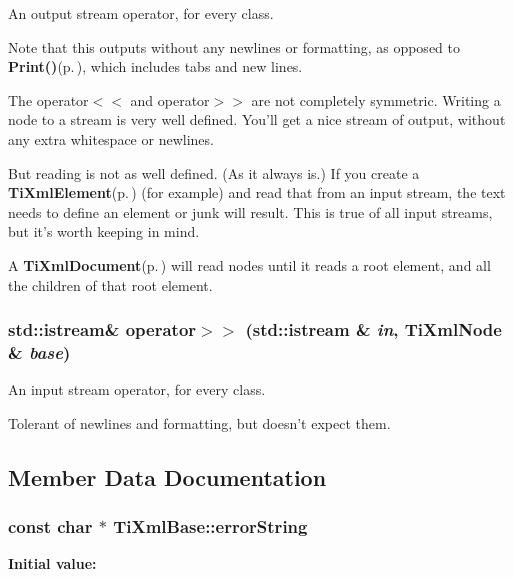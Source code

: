 An output stream operator, for every class. 

Note that this outputs without any newlines or formatting, as opposed to {\bf Print()}{\rm (p.\,\pageref{classTiXmlBase_TiXmlNodea73})}, which includes tabs and new lines.

The operator$<$$<$ and operator$>$$>$ are not completely symmetric. Writing a node to a stream is very well defined. You'll get a nice stream of output, without any extra whitespace or newlines.

But reading is not as well defined. (As it always is.) If you create a {\bf Ti\-Xml\-Element}{\rm (p.\,\pageref{classTiXmlElement})} (for example) and read that from an input stream, the text needs to define an element or junk will result. This is true of all input streams, but it's worth keeping in mind.

A {\bf Ti\-Xml\-Document}{\rm (p.\,\pageref{classTiXmlDocument})} will read nodes until it reads a root element, and all the children of that root element.
\subsubsection{\setlength{\rightskip}{0pt plus 5cm}std::istream\& operator$>$$>$ (std::istream \& {\em in}, {\bf Ti\-Xml\-Node} \& {\em base})\hspace{0.3cm}{\tt  [friend, inherited]}}\label{classTiXmlNode_TiXmlUnknownn0}


An input stream operator, for every class. 

Tolerant of newlines and formatting, but doesn't expect them.

\subsection{Member Data Documentation}
\subsubsection{\setlength{\rightskip}{0pt plus 5cm}const char $\ast$ Ti\-Xml\-Base::error\-String\hspace{0.3cm}{\tt  [static, protected, inherited]}}\label{classTiXmlBase_TiXmlUnknownt0}


{\bf Initial value:}

